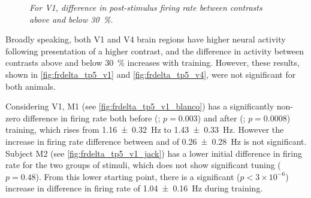 %

\begin{figure}[htbp]%
    \centering
    \hspace*{\fill}
    \hspace*{\fill}\hspace{.2cm}\hspace*{\fill}
    \hspace*{\fill}
    \caption{\textit{For \ac{V1}, difference in post-stimulus firing rate between contrasts above and below \SI{30}{\percent}.}
    \label{fig:frdelta_tp5_v1}
}
\end{figure}


Broadly speaking, both \ac{V1} and \ac{V4} brain regions have higher neural activity following presentation of a higher contrast, and the difference in activity between contrasts above and below \SI{30}{\percent} increases with training.
However, these results, shown in \autoref{fig:frdelta_tp5_v1} and \autoref{fig:frdelta_tp5_v4}, were not significant for both animals.

Considering \ac{V1}, \ac{M1} (see \autoref{fig:frdelta_tp5_v1_blanco}) has a significantly non-zero difference in firing rate both before (; $p=0.003$) and after (; $p=0.0008$) training, which rises from \SI{+1.16\pm0.32}{Hz} to \SI{+1.43\pm0.33}{Hz}.
However the increase in firing rate difference between  and  of \SI{+0.26\pm0.28}{Hz} is not significant.
Subject \ac{M2} (see \autoref{fig:frdelta_tp5_v1_jack}) has a lower initial difference in firing rate for the two groups of stimuli, which does not show significant tuning ($p=0.48$).
From this lower starting point, there is a significant ($p < 3 \times 10^{-6}$) increase in difference in firing rate of \SI{+1.04\pm0.16}{Hz} during training.


